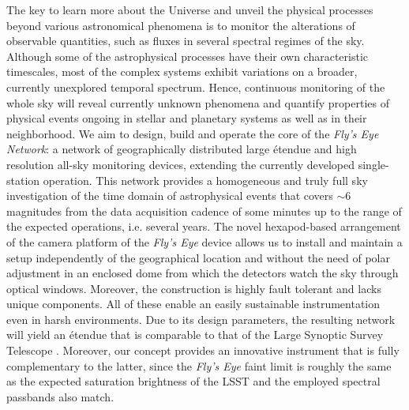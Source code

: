 \documentclass[11pt,twoside]{article}
\begin{document}
The key to learn more about the Universe and unveil the physical 
processes beyond various astronomical phenomena is to monitor the 
alterations of observable quantities, such as fluxes in several spectral 
regimes of the sky. Although some of the astrophysical processes have 
their own characteristic timescales, most of the complex systems exhibit 
variations on a broader, currently unexplored temporal spectrum. Hence, 
continuous monitoring of the whole sky will reveal currently 
unknown phenomena and quantify properties of physical events ongoing in 
stellar and planetary systems as well as in their neighborhood. We aim 
to design, build and operate the core of the {\it Fly's Eye Network}: a 
network of geographically distributed large \'etendue and high 
resolution all-sky monitoring devices, extending the currently developed 
single-station operation. This network provides a homogeneous and 
truly full sky investigation of the time domain of astrophysical events 
that covers $\sim6$ magnitudes from the data acquisition cadence of some 
minutes up to the range of the expected operations, i.e. several years. 
The novel hexapod-based arrangement of the camera platform of the 
{\it Fly's Eye} device allows us to install and 
maintain a setup independently of 
the geographical location and without the need of polar adjustment in an 
enclosed dome from which the detectors watch the sky through optical 
windows. Moreover, the construction is highly fault tolerant and lacks 
unique components. All of these enable an easily sustainable 
instrumentation even in harsh environments. Due to its design 
parameters, the resulting network will yield an \'etendue that is 
comparable to that of the Large Synoptic Survey Telescope 
\citep[LSST,][]{ivezic2008}.
Moreover, our concept provides an innovative instrument that is fully 
complementary to the latter, since the {\it Fly's Eye} faint limit is roughly 
the same as the expected saturation brightness of the LSST and the 
employed spectral passbands also match.
\end{document}
